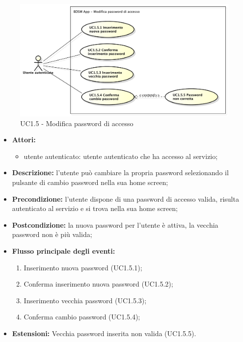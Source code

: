 \begin{figure}[!htbp]
	\centering
	\centerline{\includegraphics[scale=0.45]{./images/UC1_5.pdf}}
	\caption{UC1.5 - Modifica password di accesso}
\end{figure}

\begin{itemize}
	\item \textbf{Attori:}
	\begin{itemize}
		\item utente autenticato: utente autenticato che ha accesso al servizio;
	\end{itemize}
	\item \textbf{Descrizione:} l'utente può cambiare la propria password selezionando il pulsante di cambio password nella sua home screen;
	\item \textbf{Precondizione:} l'utente dispone di una password di accesso valida, risulta autenticato al servizio e si trova nella sua home screen;
	\item \textbf{Postcondizione:} la nuova password per l'utente è attiva, la vecchia password non è più valida;
	\item \textbf{Flusso principale degli eventi:}
	\begin{enumerate}
		\item Inserimento nuova password (UC1.5.1);
		\item Conferma inserimento nuova password (UC1.5.2);
		\item Inserimento vecchia password (UC1.5.3);
		\item Conferma cambio password (UC1.5.4);
	\end{enumerate}
	\item \textbf{Estensioni:} Vecchia password inserita non valida (UC1.5.5).

\end{itemize}

